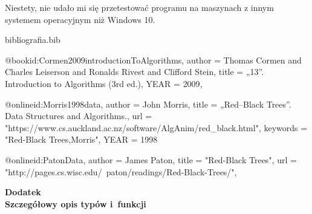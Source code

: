 \documentclass[12pt,a4paper,twoside]{article}
\begin{document}
Niestety, nie udało mi się przetestować programu na maszynach z innym systemem operacyjnym niż Windows 10.

\begin{filecontents}{bibliografia.bib}


@book{id:Cormen2009introductionToAlgorithms,
	author	= {Thomas Cormen and Charles Leiserson and Ronalds Rivest and Clifford Stein},
	title		= {„13”. Introduction to Algorithms (3rd ed.)},
	YEAR		= {2009},
}

@online{id:Morris1998data,
    author = {John Morris},
    title = {„Red–Black Trees”. Data Structures and Algorithms.},
    url  = "https://www.cs.auckland.ac.nz/software/AlgAnim/red_black.html",
    keywords = "Red-Black Trees,Morris",
    YEAR		= {1998}
}

@online{id:PatonData,
    author = {James Paton},
    title = "Red-Black Trees",
    url  = "http://pages.cs.wisc.edu/~paton/readings/Red-Black-Trees/",
}

\end{filecontents}





\cleardoublepage

\rule{0cm}{0cm}

\vfill

\begin{center}
\Huge\bfseries Dodatek\\Szczegółowy opis typów i~funkcji\par
\end{center}

\vfill 

\rule{0cm}{0cm}
\end{document}

